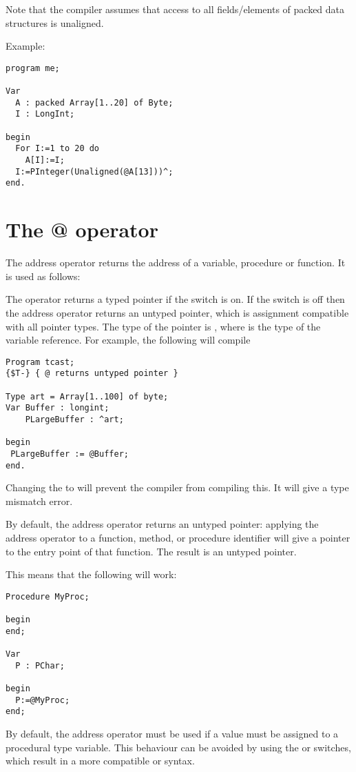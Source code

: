 Note that the compiler assumes that access to all fields/elements of
packed data structures is unaligned.

Example:
\begin{verbatim}
program me;

Var
  A : packed Array[1..20] of Byte;
  I : LongInt;

begin
  For I:=1 to 20 do
    A[I]:=I;
  I:=PInteger(Unaligned(@A[13]))^;
end.
\end{verbatim}

\section{The @ operator}
The address operator  returns the address of a variable, procedure
or function. It is used as follows:

The  operator returns a typed pointer if the  switch is on.
If the  switch is off then the address operator returns an untyped
pointer, which is assignment compatible with all pointer types. The type of
the pointer is , where  is the type of the variable
reference.
For example, the following will compile
\begin{verbatim}
Program tcast;
{$T-} { @ returns untyped pointer }

Type art = Array[1..100] of byte;
Var Buffer : longint;
    PLargeBuffer : ^art;

begin
 PLargeBuffer := @Buffer;
end.
\end{verbatim}
Changing the  to  will prevent the compiler from
compiling this. It will give a type mismatch error.

By default, the address operator returns an untyped pointer: applying 
the address operator to a function, method, or procedure identifier 
will give a pointer to the entry point of that function. 
The result is an untyped pointer.

This means that the following will work:
\begin{verbatim}
Procedure MyProc;

begin
end;

Var
  P : PChar;
 
begin
  P:=@MyProc;
end; 
\end{verbatim}
By default, the address operator must be used if a value must be assigned
to a procedural type variable. This behaviour can be avoided by using the
 or  switches, which result in a more compatible 
\delphi or \tp syntax.

